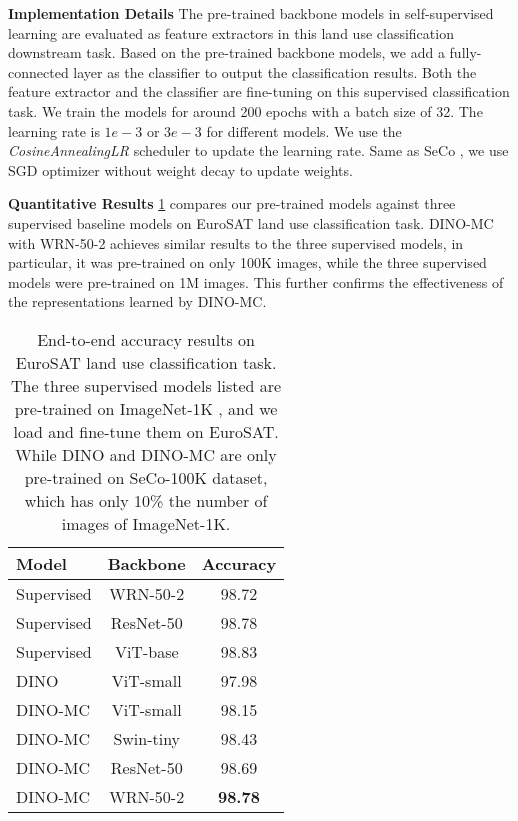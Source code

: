 \documentclass[10pt,twocolumn,letterpaper]{article}
\begin{document}
\textbf{Implementation Details }
The pre-trained backbone models in self-supervised learning are evaluated as feature extractors in this land use classification downstream task.
Based on the pre-trained backbone models, we add a fully-connected layer as the classifier to output the classification results.
Both the feature extractor and the classifier are fine-tuning on this supervised classification task.
We train the models for around 200 epochs with a batch size of 32.
The learning rate is $1e-3$ or $3e-3$ for different models.
We use the \textit{CosineAnnealingLR} scheduler to update the learning rate.
Same as SeCo \cite{manas2021seasonal}, we use SGD optimizer without weight decay to update weights.

\textbf{Quantitative Results}
\cref{table:EuroSAT_results} compares our pre-trained models against three supervised baseline models on EuroSAT land use classification task.
DINO-MC with WRN-50-2 achieves similar results to the three supervised models, in particular, it was pre-trained on only 100K images, while the three supervised models were pre-trained on 1M images.
This further confirms the effectiveness of the representations learned by DINO-MC.

\begin{table}
  \centering
  \begin{tabular}{lcc}
    \toprule
    Model & Backbone & Accuracy \\
    \midrule
    Supervised & WRN-50-2 & 98.72 \\
    Supervised & ResNet-50 & 98.78 \\
    Supervised & ViT-base & 98.83 \\
    \midrule
DINO & ViT-small & 97.98 \\
DINO-MC  & ViT-small & 98.15 \\
DINO-MC  & Swin-tiny & 98.43 \\
    DINO-MC  & ResNet-50 & 98.69 \\
    DINO-MC  & WRN-50-2 & \textbf{98.78} \\
    \bottomrule
  \end{tabular}
  \caption{
  End-to-end accuracy results on EuroSAT land use classification task.
  The three supervised models listed are pre-trained on ImageNet-1K \cite{russakovsky2015imagenet}, and we load and fine-tune them on EuroSAT.
  While DINO and DINO-MC are only pre-trained on SeCo-100K dataset, which has only 10\% the number of images of ImageNet-1K.
  }
  \label{table:EuroSAT_results}
\end{table}
\end{document}

